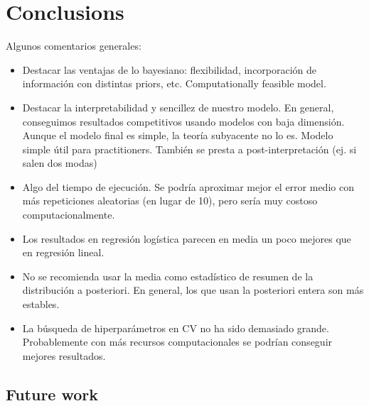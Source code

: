 %
%

\chapter{Conclusions}\label{ch:conclusions}

\begin{outcomment}
  Algunos comentarios generales:
  \begin{itemize}
    \item Destacar las ventajas de lo bayesiano: flexibilidad, incorporación de información con distintas priors, etc. Computationally feasible model.
    \item Destacar la interpretabilidad y sencillez de nuestro modelo. En general, conseguimos resultados competitivos usando modelos con baja dimensión. Aunque el modelo final es simple, la teoría subyacente no lo es. Modelo simple útil para practitioners. También se presta a post-interpretación (ej. si salen dos modas)
    \item Algo del tiempo de ejecución. Se podría aproximar mejor el error medio con más repeticiones aleatorias (en lugar de 10), pero sería muy costoso computacionalmente.
    \item Los resultados en regresión logística parecen en media un poco mejores que en regresión lineal.
    \item No se recomienda usar la media como estadístico de resumen de la distribución a posteriori. En general, los que usan la posteriori entera son más estables.
    \item La búsqueda de hiperparámetros en CV no ha sido demasiado grande. Probablemente con más recursos computacionales se podrían conseguir mejores resultados.
  \end{itemize}
\end{outcomment}

\section{Future work}

